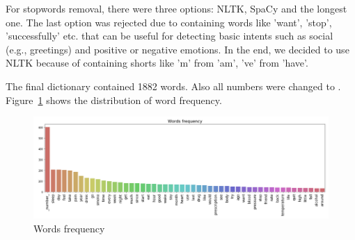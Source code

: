 \documentclass[11pt]{article}
\begin{document}
For stopwords removal, there were three options: NLTK, SpaCy and the
longest one. The last option was rejected due to containing words like
'want', 'stop', 'successfully' etc. that can be useful for detecting
basic intents such as social (e.g., greetings) and positive or
negative emotions. In the end, we decided to use NLTK because of
containing shorts like 'm' from 'am', 've' from 'have'.

The final dictionary contained 1882 words. Also all numbers were
changed to {}. Figure~\ref{words_freq} shows the distribution of word frequency. 

 \begin{figure}[h]
 	\centering
 	\includegraphics[scale=0.4]{report2.png}
	\caption{Words frequency}
 \label{words_freq}
 \end{figure}
\FloatBarrier



\end{document}
